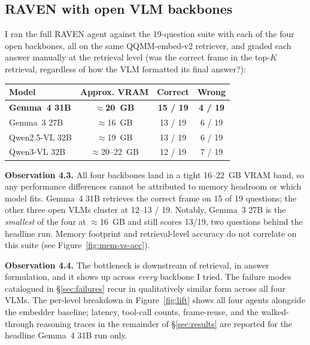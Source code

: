 \documentclass[12pt,letterpaper,oneside]{article}
\begin{document}
\subsection{RAVEN with open VLM backbones}\label{sec:openvlms}

I ran the full RAVEN agent against the 19-question suite with each of
the four open backbones, all on the same QQMM-embed-v2 retriever, and
graded each answer manually at the retrieval level (was the correct
frame in the top-$K$ retrieval, regardless of how the VLM formatted
its final answer?):

\begin{center}
  \small
  \begin{tabular}{@{}lccc@{}}
    \toprule
    Model & Approx. VRAM & Correct & Wrong \\
    \midrule
    \textbf{Gemma~4 31B}    & \textbf{$\approx$20~GB}  & \textbf{15 / 19} & \textbf{4 / 19} \\
    Gemma~3 27B             & $\approx$16~GB           & 13 / 19          & 6 / 19          \\
    Qwen2.5-VL 32B          & $\approx$19~GB           & 13 / 19          & 6 / 19          \\
    Qwen3-VL 32B            & $\approx$20--22~GB       & 12 / 19          & 7 / 19          \\
    \bottomrule
  \end{tabular}
\end{center}

\textbf{Observation 4.3.}  All four backbones land in a tight
16--22~GB VRAM band, so any performance differences cannot be
attributed to memory headroom or which model fits. Gemma~4 31B
retrieves the correct frame on 15 of 19 questions; the other three
open VLMs cluster at 12--13 / 19. Notably, Gemma~3 27B is the
\emph{smallest} of the four at $\approx$16~GB and still scores
13/19, two questions behind the headline run. Memory footprint and
retrieval-level accuracy do not correlate on this suite (see
Figure~\ref{fig:mem-vs-acc}).

\textbf{Observation 4.4.}  The bottleneck is downstream of retrieval,
in answer formulation, and it shows up across \emph{every} backbone I
tried. The failure modes catalogued in \S\ref{sec:failures} recur in
qualitatively similar form across all four VLMs. The per-level
breakdown in Figure~\ref{fig:lift} shows all four agents alongside
the embedder baseline; latency, tool-call counts, frame-reuse, and
the walked-through reasoning traces in the remainder of
\S\ref{sec:results} are reported for the headline Gemma~4 31B run
only.
\end{document}
